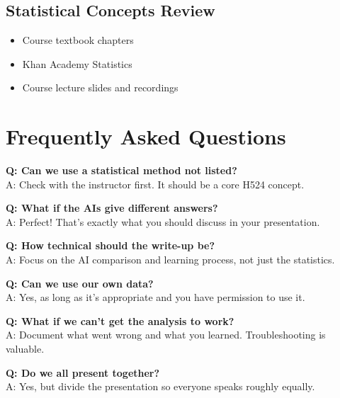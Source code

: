 \documentclass[11pt]{article}
\begin{document}
\subsection{Statistical Concepts Review}
\begin{itemize}
\item Course textbook chapters
\item Khan Academy Statistics
\item Course lecture slides and recordings
\end{itemize}

\section{Frequently Asked Questions}

\textbf{Q: Can we use a statistical method not listed?}\\
A: Check with the instructor first. It should be a core H524 concept.

\textbf{Q: What if the AIs give different answers?}\\
A: Perfect! That's exactly what you should discuss in your presentation.

\textbf{Q: How technical should the write-up be?}\\
A: Focus on the AI comparison and learning process, not just the statistics.

\textbf{Q: Can we use our own data?}\\
A: Yes, as long as it's appropriate and you have permission to use it.

\textbf{Q: What if we can't get the analysis to work?}\\
A: Document what went wrong and what you learned. Troubleshooting is valuable.

\textbf{Q: Do we all present together?}\\
A: Yes, but divide the presentation so everyone speaks roughly equally.
\end{document}
